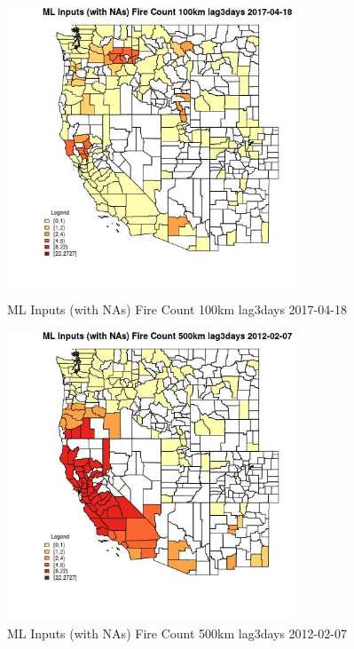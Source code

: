 \begin{figure} 
\centering  
\includegraphics[width=0.77\textwidth]{Code_Outputs/Report_ML_input_PM25_Step4_part_f_de_duplicated_aveswNAs_CountyFire_Count_100km_lag3daysMean2017-04-18.jpg} 
\caption{\label{fig:Report_ML_input_PM25_Step4_part_f_de_duplicated_aveswNAsCountyFire_Count_100km_lag3daysMean2017-04-18}ML Inputs (with NAs) Fire Count 100km lag3days 2017-04-18} 
\end{figure} 
 

\clearpage 

\begin{figure} 
\centering  
\includegraphics[width=0.77\textwidth]{Code_Outputs/Report_ML_input_PM25_Step4_part_f_de_duplicated_aveswNAs_CountyFire_Count_500km_lag3daysMean2012-02-07.jpg} 
\caption{\label{fig:Report_ML_input_PM25_Step4_part_f_de_duplicated_aveswNAsCountyFire_Count_500km_lag3daysMean2012-02-07}ML Inputs (with NAs) Fire Count 500km lag3days 2012-02-07} 
\end{figure} 
 

